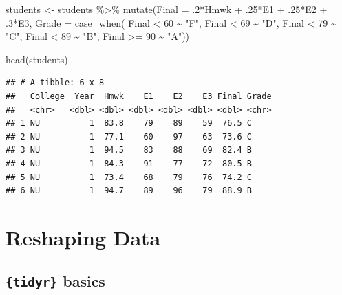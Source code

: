 \documentclass[
]{book}
\newenvironment{Shaded}{\begin{snugshade}}{\end{snugshade}}
\newcommand{\AttributeTok}[1]{\textcolor[rgb]{0.77,0.63,0.00}{#1}}
\newcommand{\DecValTok}[1]{\textcolor[rgb]{0.00,0.00,0.81}{#1}}
\newcommand{\FunctionTok}[1]{\textcolor[rgb]{0.00,0.00,0.00}{#1}}
\newcommand{\NormalTok}[1]{#1}
\newcommand{\OtherTok}[1]{\textcolor[rgb]{0.56,0.35,0.01}{#1}}
\newcommand{\SpecialCharTok}[1]{\textcolor[rgb]{0.00,0.00,0.00}{#1}}
\newcommand{\StringTok}[1]{\textcolor[rgb]{0.31,0.60,0.02}{#1}}
\begin{document}
\begin{Shaded}
\begin{Highlighting}[]
\NormalTok{students }\OtherTok{\textless{}{-}}\NormalTok{ students }\SpecialCharTok{\%\textgreater{}\%} 
  \FunctionTok{mutate}\NormalTok{(}\AttributeTok{Final =}\NormalTok{ .}\DecValTok{2}\SpecialCharTok{*}\NormalTok{Hmwk }\SpecialCharTok{+}\NormalTok{ .}\DecValTok{25}\SpecialCharTok{*}\NormalTok{E1 }\SpecialCharTok{+}\NormalTok{ .}\DecValTok{25}\SpecialCharTok{*}\NormalTok{E2 }\SpecialCharTok{+}\NormalTok{ .}\DecValTok{3}\SpecialCharTok{*}\NormalTok{E3,}
         \AttributeTok{Grade =} \FunctionTok{case\_when}\NormalTok{(}
\NormalTok{           Final }\SpecialCharTok{\textless{}} \DecValTok{60} \SpecialCharTok{\textasciitilde{}} \StringTok{"F"}\NormalTok{,}
\NormalTok{           Final }\SpecialCharTok{\textless{}} \DecValTok{69} \SpecialCharTok{\textasciitilde{}} \StringTok{"D"}\NormalTok{,}
\NormalTok{           Final }\SpecialCharTok{\textless{}} \DecValTok{79} \SpecialCharTok{\textasciitilde{}} \StringTok{"C"}\NormalTok{,}
\NormalTok{           Final }\SpecialCharTok{\textless{}} \DecValTok{89} \SpecialCharTok{\textasciitilde{}} \StringTok{"B"}\NormalTok{,}
\NormalTok{           Final }\SpecialCharTok{\textgreater{}=} \DecValTok{90} \SpecialCharTok{\textasciitilde{}} \StringTok{"A"}\NormalTok{))}

\FunctionTok{head}\NormalTok{(students)}
\end{Highlighting}
\end{Shaded}

\begin{verbatim}
## # A tibble: 6 x 8
##   College  Year  Hmwk    E1    E2    E3 Final Grade
##   <chr>   <dbl> <dbl> <dbl> <dbl> <dbl> <dbl> <chr>
## 1 NU          1  83.8    79    89    59  76.5 C    
## 2 NU          1  77.1    60    97    63  73.6 C    
## 3 NU          1  94.5    83    88    69  82.4 B    
## 4 NU          1  84.3    91    77    72  80.5 B    
## 5 NU          1  73.4    68    79    76  74.2 C    
## 6 NU          1  94.7    89    96    79  88.9 B
\end{verbatim}

\hypertarget{reshaping-data}{%
\chapter{Reshaping Data}\label{reshaping-data}}

\hypertarget{tidyr-basics}{%
\section*{\texorpdfstring{\texttt{\{tidyr\}} basics}{\{tidyr\} basics}}\label{tidyr-basics}}
\end{document}
